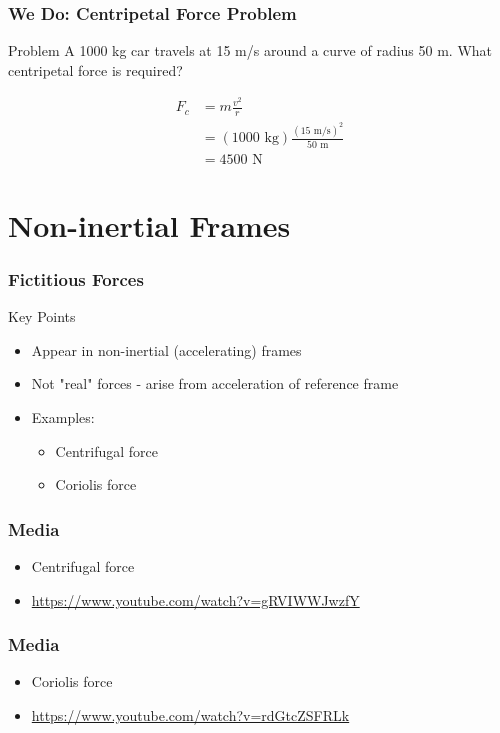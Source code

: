 \documentclass{beamer}
\begin{document}
\begin{frame}
\frametitle{We Do: Centripetal Force Problem}
\begin{block}{Problem}
A 1000 kg car travels at 15 m/s around a curve of radius 50 m.
What centripetal force is required?
\end{block}
\begin{align*}
F_c &= m\frac{v^2}{r} \\
&= (1000\text{ kg})\frac{(15\text{ m/s})^2}{50\text{ m}} \\
&= 4500\text{ N}
\end{align*}
\end{frame}

\section{Non-inertial Frames}


\begin{frame}
\frametitle{Fictitious Forces}
\begin{block}{Key Points}
\begin{itemize}
\item Appear in non-inertial (accelerating) frames
\item Not "real" forces - arise from acceleration of reference frame
\item Examples:
  \begin{itemize}
  \item Centrifugal force
  \item Coriolis force
  \end{itemize}
\end{itemize}
\end{block}
\end{frame}
\begin{frame}
\frametitle{Media}
     \begin{itemize}
  \item Centrifugal force
  \item \hyperlink{https://www.youtube.com/watch?v=gRVIWWJwzfY}{https://www.youtube.com/watch?v=gRVIWWJwzfY}
  \end{itemize}
\end{frame}

\begin{frame}
\frametitle{Media}
     \begin{itemize}
  \item Coriolis force
  \item \hyperlink{https://www.youtube.com/watch?v=rdGtcZSFRLk}{https://www.youtube.com/watch?v=rdGtcZSFRLk}
  \end{itemize}
\end{frame}
\end{document}
